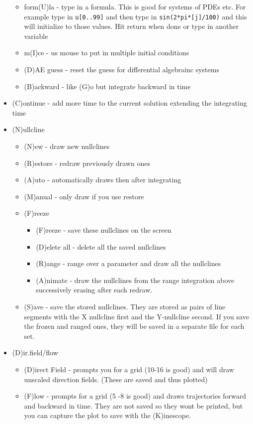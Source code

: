 \documentclass{article}
\begin{document}
\begin{itemize}
\begin{itemize}
\item  form(U)la - type in a formula. This is good for systems of PDEs etc. For example type in {\tt u[0..99]} and then type in {\tt sin(2*pi*[j]/100)} and this will initialize to those values. Hit return when done or type in another variable
\item m(I)ce - us mouse to put in multiple initial conditions
\item (D)AE guess - reset the guess for differential algebrainc systems 
\item (B)ackward - like (G)o but integrate backward in time
\end{itemize}
\item (C)ontinue - add more time to the current solution extending the integrating time
\item (N)ullcline 
\begin{itemize}
\item (N)ew - draw new nullclines
\item (R)estore - redraw previously drawn ones
\item (A)uto - automatically draws then after integrating
\item (M)anual - only draw if you use restore
\item (F)reeze
\begin{itemize}
\item (F)reeze - save these nullclines on the screen
\item (D)elete all - delete all the saved nullclines
\item (R)ange - range over a parameter and draw all the nullclines
\item (A)nimate - draw the nullclines from the range integration above successively erasing after each redraw.
\end{itemize}
\item (S)ave - save the stored nullclines. They are stored as pairs of line segments with the X nullcline first and the Y-nullcline second. If you save the frozen and ranged ones, they will be saved in a separate file for each set.
\end{itemize}
\item (D)ir.field/flow 
\begin{itemize}
\item (D)irect Field - prompts you for a grid (10-16 is good) and will draw unscaled direction fields. (These are saved and thus plotted)
\item (F)low - prompts for a grid (5 -8 is good) and draws trajectories forward and backward in time. They are not saved so they wont be printed, but you can capture the plot to save with the (K)inescope.

\end{itemize}
\end{itemize}
\end{document}

